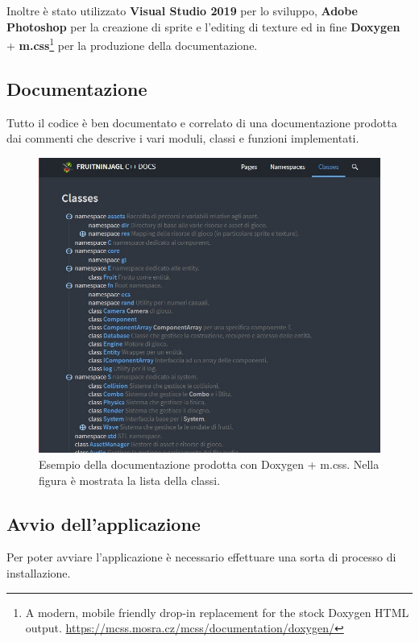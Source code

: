 Inoltre è stato utilizzato \textbf{Visual Studio 2019} per lo sviluppo, \textbf{Adobe Photoshop} per la creazione di sprite e l'editing di texture ed in fine \textbf{Doxygen} + \textbf{m.css}\footnote{A modern, mobile friendly drop-in replacement for the stock Doxygen HTML output. \url{https://mcss.mosra.cz/mcss/documentation/doxygen/}} per la produzione della documentazione.


\subsection{Documentazione}
Tutto il codice è ben documentato e correlato di una documentazione prodotta dai commenti che descrive i vari moduli, classi e funzioni implementati.

\begin{figure}[!htp]
	\centering
	\includegraphics[width=0.9\linewidth]{images/ch10/5}
	\caption{Esempio della documentazione prodotta con Doxygen + m.css. Nella figura è mostrata la lista della classi. }
\end{figure}




\subsection{Avvio dell'applicazione}
Per poter avviare l'applicazione è necessario effettuare una sorta di processo di installazione.

